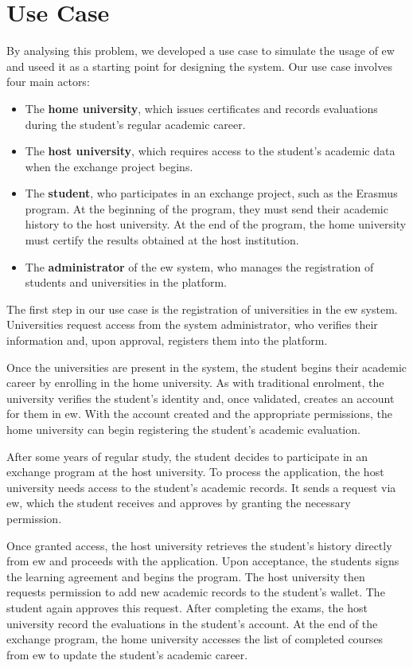 \section{Use Case}
By analysing this problem, we developed a use case to simulate the usage of \gls{ew} and useed it as a starting point for designing the system. Our use case involves four main actors:
\begin{itemize}
    \item The \textbf{home university}, which issues certificates and records evaluations during the student's regular academic career.
    \item The \textbf{host university}, which requires access to the student's academic data when the exchange project begins.
    \item The \textbf{student}, who participates in an exchange project, such as the Erasmus program. At the beginning of the program, they must send their academic history to the host university. At the end of the program, the home university must certify the results obtained at the host institution.
    \item The \textbf{administrator} of the \gls{ew} system, who manages the registration of students and universities in the platform.
\end{itemize}
The first step in our use case is the registration of universities in the \gls{ew} system. Universities request access from the system administrator, who verifies their information and, upon approval, registers them into the platform.

Once the universities are present in the system, the student begins their academic career by enrolling in the home university. As with traditional enrolment, the university verifies the student's identity and, once validated, creates an account for them in \gls{ew}. With the account created and the appropriate permissions, the home university can begin registering the student's academic evaluation.

After some years of regular study, the student decides to participate in an exchange program at the host university. To process the application, the host university needs access to the student's academic records. It sends a request via \gls{ew}, which the student receives and approves by granting the necessary permission.

Once granted access, the host university retrieves the student's history directly from \gls{ew} and proceeds with the application. Upon acceptance, the students signs the learning agreement and begins the program. The host university then requests permission to add new academic records to the student's wallet. The student again approves this request.
After completing the exams, the host university record the evaluations in the student's account. At the end of the exchange program, the home university accesses the list of completed courses from \gls{ew} to update the student's academic career.

